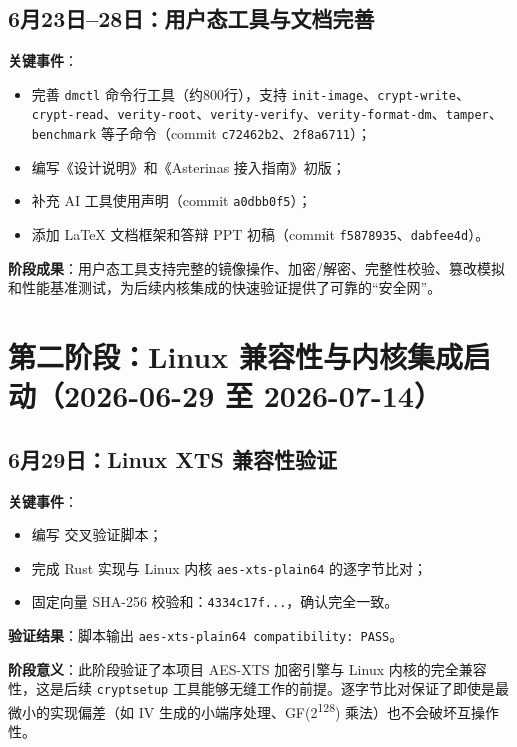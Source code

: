 \subsection{6月23日--28日：用户态工具与文档完善}

\textbf{关键事件}：
\begin{itemize}
    \item 完善 \texttt{dmctl} 命令行工具（约800行），支持 \texttt{init-image}、\texttt{crypt-write}、\texttt{crypt-read}、\texttt{verity-root}、\texttt{verity-verify}、\texttt{verity-format-dm}、\texttt{tamper}、\texttt{benchmark} 等子命令（commit \texttt{c72462b2}、\texttt{2f8a6711}）；
    \item 编写《设计说明》和《Asterinas 接入指南》初版；
    \item 补充 AI 工具使用声明（commit \texttt{a0dbb0f5}）；
    \item 添加 LaTeX 文档框架和答辩 PPT 初稿（commit \texttt{f5878935}、\texttt{dabfee4d}）。
\end{itemize}

\textbf{阶段成果}：用户态工具支持完整的镜像操作、加密/解密、完整性校验、篡改模拟和性能基准测试，为后续内核集成的快速验证提供了可靠的“安全网”。

\section{第二阶段：Linux 兼容性与内核集成启动（2026-06-29 至 2026-07-14）}

\subsection{6月29日：Linux XTS 兼容性验证}

\textbf{关键事件}：
\begin{itemize}
    \item 编写 \texttt{} 交叉验证脚本；
    \item 完成 Rust 实现与 Linux 内核 \texttt{aes-xts-plain64} 的逐字节比对；
    \item 固定向量 SHA-256 校验和：\texttt{4334c17f...}，确认完全一致。
\end{itemize}

\textbf{验证结果}：脚本输出 \texttt{aes-xts-plain64 compatibility: PASS}。

\textbf{阶段意义}：此阶段验证了本项目 AES-XTS 加密引擎与 Linux 内核的完全兼容性，这是后续 \texttt{cryptsetup} 工具能够无缝工作的前提。逐字节比对保证了即使是最微小的实现偏差（如 IV 生成的小端序处理、GF(2\textsuperscript{128}) 乘法）也不会破坏互操作性。

